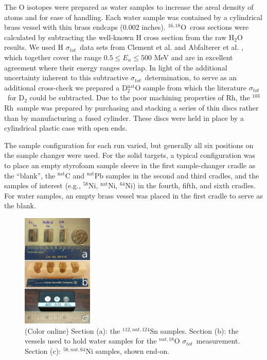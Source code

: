 \documentclass[twocolumn,secnumarabic,amssymb, nobibnotes, aps, prl,
superscriptaddress, nobalancelastpage]{revtex4}
\newcommand{\tot}{\ensuremath{\sigma_{tot}}}
\newcommand{\oSixEight}{\ensuremath{^{16,18}}O}
\newcommand{\rhThree}{\ensuremath{^{103}}R\lowercase{h}}
\begin{document}
The O isotopes were prepared as water samples to increase the areal density
of atoms and for ease of handling. Each water sample was contained by a
cylindrical brass vessel with thin brass endcaps (0.002 inches). \oSixEight\
cross sections were calculated by
subtracting the well-known H cross section from the raw H$_{2}$O results.
We used H \tot\  data sets from Clement et al. \cite{Clement1972} and Abfalterer
et al. \cite{Abfalterer2001}, which together cover the range $0.5 \leq E_n \leq 500$ MeV
and are in excellent agreement where their energy ranges overlap. In light of
the additional uncertainty inherent to this subtractive \tot\ determination,
to serve as an additional cross-check we prepared a D$_{2}^{\text{nat}}$O sample
from which the literature \tot\ for D$_{2}$ could be subtracted. Due to
the poor machining properties of Rh, the \rhThree\ sample
was prepared by purchasing and stacking a series of thin discs rather than by
manufacturing a fused cylinder. These discs were held in place
by a cylindrical plastic case with open ends.

The sample configuration for each run varied, but generally all six positions on
the sample changer were used. For the solid targets, a typical configuration was
to place an empty styrofoam sample sleeve in the first sample-changer cradle as
the ``blank'', the $^{\text{nat}}$C and $^{\text{nat}}$Pb samples in the second and third
cradles, and the samples of interest (e.g., $^{58}$Ni, $^{\text{nat}}$Ni, $^{64}$Ni) in
the fourth, fifth, and sixth cradles. For water samples, an empty brass vessel
was placed in the first cradle to serve as the blank.
\begin{figure}
    \includegraphics[width=0.3\textwidth]{figures/AllIsotopicSamples.jpg}
    \caption{(Color online) Section (a): the ${^{112,nat,124}}$Sn samples. Section (b): the 
        vessels used to hold water samples for the ${^{nat, 18}}$O \tot\  measurement. 
        Section (c): ${^{58,nat,64}}$Ni samples, shown end-on.}
    \label{SamplesImage}
\end{figure}
\end{document}
